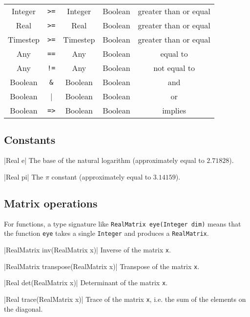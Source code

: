\begin{table}[H]
\begin{tabular}{ c c c c c }
Integer & \verb|>=| & Integer & Boolean & greater than or equal \\
Real & \verb|>=| & Real & Boolean & greater than or equal \\
Timestep & \verb|>=| & Timestep & Boolean & greater than or equal \\

Any & \verb|==| & Any & Boolean & equal to \\

Any & \verb|!=| & Any & Boolean & not equal to \\

Boolean & \verb|&| & Boolean & Boolean & and \\

Boolean & \verb||| & Boolean & Boolean & or \\

Boolean & \verb|=>| & Boolean & Boolean & implies \\

\bottomrule
\end{tabular}
\end{table}


\subsection{Constants}
\label{sec:builtin-constants}

\blog|Real e|
\myindent The base of the natural logarithm (approximately equal to $2.71828$).

\blog|Real pi|
\myindent The $\pi$ constant (approximately equal to $3.14159$).


\subsection{Matrix operations}
\label{sec:builtin-matrix-ops}

For functions, a type signature like \verb|RealMatrix eye(Integer dim)| means
that the function \verb|eye| takes a single \verb|Integer| and produces a
\verb|RealMatrix|.

\blog|RealMatrix inv(RealMatrix x)|
\myindent Inverse of the matrix \verb|x|.

\blog|RealMatrix transpose(RealMatrix x)|
\myindent Transpose of the matrix \verb|x|.

\blog|Real det(RealMatrix x)|
\myindent Determinant of the matrix \verb|x|.

\blog|Real trace(RealMatrix x)|
\myindent Trace of the matrix \verb|x|, i.e. the sum of the elements on the diagonal.

